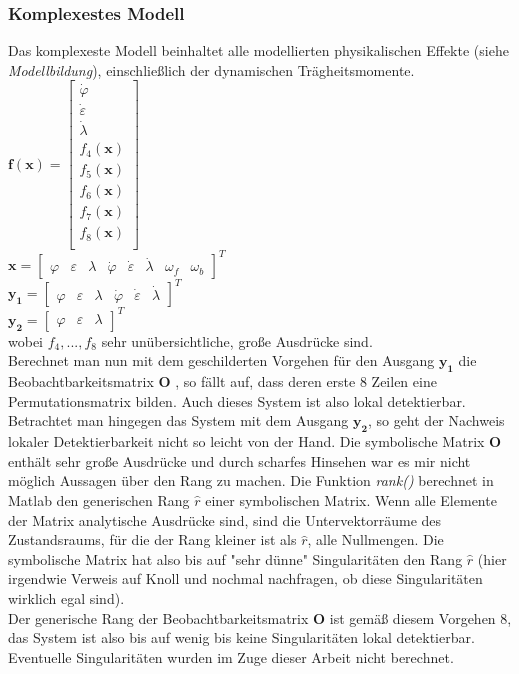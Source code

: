 \documentclass[times, 10pt,twocolumn]{article}
\begin{document}
	\subsubsection{Komplexestes Modell}
	Das komplexeste Modell beinhaltet alle modellierten physikalischen Effekte (siehe \textit{Modellbildung}), einschließlich der dynamischen Trägheitsmomente. \\
	$\bm f(\bm x) = \begin{bmatrix}
	\dot \varphi \\
	\dot \varepsilon \\
	\dot \lambda  \\
	f_4(\bm x) \\ 
	f_5(\bm x) \\
	f_6(\bm x) \\
	f_7(\bm x) \\
	f_8(\bm x) \\
	\end{bmatrix} $ \\ 
	$\bm x = \begin{bmatrix}
	\varphi & \varepsilon & \lambda & \dot \varphi & \dot \varepsilon & \dot \lambda & \omega_f & \omega_b
	\end{bmatrix}^T $ \\ 
	$\bm {y_1} = \begin{bmatrix}
	\varphi & \varepsilon & \lambda & \dot \varphi & \dot \varepsilon & \dot \lambda
	\end{bmatrix}^T $ \\
	$\bm {y_2} = \begin{bmatrix}
	\varphi & \varepsilon & \lambda 
	\end{bmatrix}^T $ \\ wobei $f_4, ..., f_8$ sehr unübersichtliche, große Ausdrücke sind. \\
	Berechnet man nun mit dem geschilderten Vorgehen für den Ausgang $\bm{y_1}$
	die Beobachtbarkeitsmatrix $\bm O$ , so fällt auf, dass deren erste 8 Zeilen eine Permutationsmatrix bilden. Auch dieses System ist also lokal detektierbar. \\
	Betrachtet man hingegen das System mit dem Ausgang $\bm{y_2}$, so geht der Nachweis lokaler Detektierbarkeit nicht so leicht von der Hand. Die symbolische Matrix $\bm O$ enthält sehr große Ausdrücke und durch scharfes Hinsehen war es mir nicht möglich Aussagen über den Rang zu machen. Die Funktion \textit{rank()} berechnet in Matlab den generischen Rang $\hat r$ einer symbolischen Matrix. Wenn alle Elemente der Matrix analytische Ausdrücke sind, sind die Untervektorräume des Zustandsraums, für die der Rang kleiner ist als $\hat r$, alle Nullmengen. Die symbolische Matrix hat also bis auf "sehr dünne" Singularitäten den Rang $\hat r$ (hier irgendwie Verweis auf Knoll und nochmal nachfragen, ob diese Singularitäten wirklich egal sind). \\
	Der generische Rang der Beobachtbarkeitsmatrix $\bm O$ ist gemäß diesem Vorgehen 8, das System ist also bis auf wenig bis keine Singularitäten lokal detektierbar. Eventuelle Singularitäten wurden im Zuge dieser Arbeit nicht berechnet. 
\end{document}
